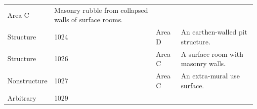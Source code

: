 \documentclass[
  12pt,
]{krantz}
\begin{document}
\begin{longtable}[]{@{}llll@{}}
\begin{minipage}[t]{0.16\columnwidth}
Area C\strut
\end{minipage} & \begin{minipage}[t]{0.38\columnwidth}\raggedright
Masonry rubble from
collapsed walls of surface
rooms.\strut
\end{minipage}\tabularnewline
\begin{minipage}[t]{0.18\columnwidth}\raggedright
Structure\strut
\end{minipage} & \begin{minipage}[t]{0.11\columnwidth}\raggedright
1024\strut
\end{minipage} & \begin{minipage}[t]{0.16\columnwidth}\raggedright
Area D\strut
\end{minipage} & \begin{minipage}[t]{0.38\columnwidth}\raggedright
An earthen-walled pit
structure.\strut
\end{minipage}\tabularnewline
\begin{minipage}[t]{0.18\columnwidth}\raggedright
Structure\strut
\end{minipage} & \begin{minipage}[t]{0.11\columnwidth}\raggedright
1026\strut
\end{minipage} & \begin{minipage}[t]{0.16\columnwidth}\raggedright
Area C\strut
\end{minipage} & \begin{minipage}[t]{0.38\columnwidth}\raggedright
A surface room with masonry
walls.\strut
\end{minipage}\tabularnewline
\begin{minipage}[t]{0.18\columnwidth}\raggedright
Nonstructure\strut
\end{minipage} & \begin{minipage}[t]{0.11\columnwidth}\raggedright
1027\strut
\end{minipage} & \begin{minipage}[t]{0.16\columnwidth}\raggedright
Area C\strut
\end{minipage} & \begin{minipage}[t]{0.38\columnwidth}\raggedright
An extra-mural use surface.\strut
\end{minipage}\tabularnewline
\begin{minipage}[t]{0.18\columnwidth}\raggedright
Arbitrary\strut
\end{minipage} & \begin{minipage}[t]{0.11\columnwidth}\raggedright
1029\strut
\end{minipage} & \begin{minipage}[t]{0.16\columnwidth}\raggedright

\end{minipage}
\end{longtable}
\end{document}
